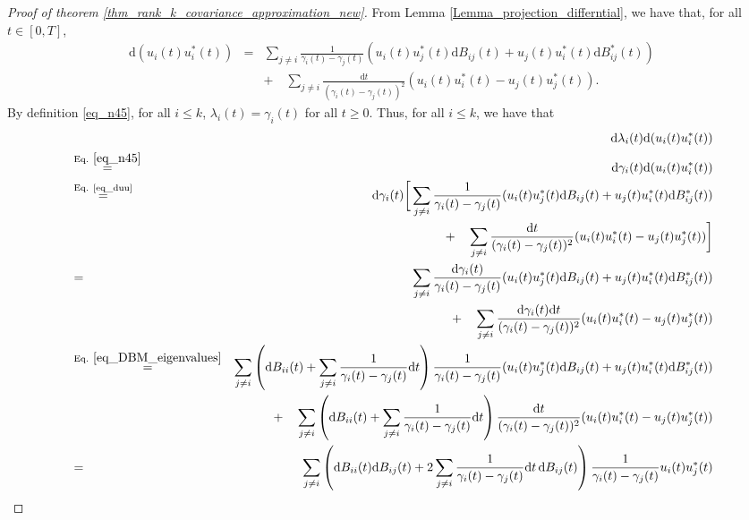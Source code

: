 \documentclass[11pt,letterpaper]{article}
\begin{document}
\begin{proof}[Proof of theorem \ref{thm_rank_k_covariance_approximation_new}]
%
From Lemma \ref{Lemma_projection_differntial}, we have that, for all $t \in [0,T]$, 
%
\begin{eqnarray}\label{eq_duu}
\mathrm{d}(u_i(t) u_i^\ast(t))&=&        \sum_{j \neq i} \frac{1}{\gamma_i(t) - \gamma_j(t)}(u_i(t) u_j^\ast(t)\mathrm{d}B_{ij}(t) + u_j(t) u_i^\ast(t)\mathrm{d}B_{ij}^\ast(t)) \nonumber \\ & & + \quad \sum_{j \neq i} \frac{\mathrm{d}t}{(\gamma_i(t)- \gamma_j(t))^2} (u_i(t) u_i^\ast(t) - u_j(t)u_j^\ast(t)).
\end{eqnarray}
%
By definition \eqref{eq_n45}, for all $i\leq k$,  $\lambda_i(t) = \gamma_i(t)$ for all $t\geq 0$.
%
Thus, for all $i \leq k$, we have that 
%
\begin{eqnarray}
& & \!\!\!\!\!\!\!\! \! \!\! \! \!\!\!\!\!\!\!\!\!\!\!\!\!\!\!\! \! \! \mathrm{d}\lambda_i(t) \mathrm{d}( u_i(t) u_i^\ast(t))\nonumber\\
%
&\stackrel{\textrm{Eq. } \eqref{eq_n45}}{=}& \mathrm{d}\gamma_i(t) \mathrm{d}( u_i(t) u_i^\ast(t)) \label{eq_dlambda_du.1} \\
%
&\stackrel{\textrm{Eq. \eqref{eq_duu}}}{=}& \mathrm{d}\gamma_i(t) \bigg[\sum_{j \neq i} \frac{1}{\gamma_i(t) - \gamma_j(t)}(u_i(t) u_j^\ast(t)\mathrm{d}B_{ij}(t) + u_j(t) u_i^\ast(t)\mathrm{d}B_{ij}^\ast(t))\nonumber\\
%
& & \quad \quad  \quad + \quad \sum_{j \neq i} \frac{\mathrm{d}t}{(\gamma_i(t)- \gamma_j(t))^2} (u_i(t) u_i^\ast(t) - u_j(t)u_j^\ast(t))\bigg]\nonumber\\
%
&=& \sum_{j \neq i} \frac{\mathrm{d}\gamma_i(t)}{\gamma_i(t) - \gamma_j(t)}(u_i(t) u_j^\ast(t)\mathrm{d}B_{ij}(t) + u_j(t) u_i^\ast(t) \mathrm{d}B_{ij}^\ast(t) )\nonumber\\
%
& &  + \quad \sum_{j \neq i} \frac{\mathrm{d}\gamma_i(t)\mathrm{d}t}{(\gamma_i(t)- \gamma_j(t))^2} (u_i(t) u_i^\ast(t) - u_j(t)u_j^\ast(t))\nonumber\\
%
&\stackrel{\textrm{Eq. } \eqref{eq_DBM_eigenvalues}}{=}& \sum_{j \neq i} \left(\mathrm{d}B_{i i}(t) +   \sum_{j \neq i} \frac{1}{\gamma_i(t) - \gamma_j(t)} \mathrm{d}t \right)\frac{1}{\gamma_i(t) - \gamma_j(t)}(u_i(t) u_j^\ast(t)\mathrm{d}B_{ij}(t) + u_j(t) u_i^\ast(t)\mathrm{d}B_{ij}^\ast(t))\nonumber\\
%
& & + \quad \sum_{j \neq i} \left(\mathrm{d}B_{i i}(t) +   \sum_{j \neq i} \frac{1}{\gamma_i(t) - \gamma_j(t)} \mathrm{d}t\right) \frac{\mathrm{d}t}{(\gamma_i(t)- \gamma_j(t))^2} (u_i(t) u_i^\ast(t) - u_j(t)u_j^\ast(t))\nonumber\\
%
&=& \sum_{j \neq i} \left(\mathrm{d}B_{i i}(t)\mathrm{d}B_{ij}(t) +  2 \sum_{j \neq i} \frac{1}{\gamma_i(t) - \gamma_j(t)} \mathrm{d}t \, \mathrm{d}B_{ij}(t) \right)\frac{1}{\gamma_i(t) - \gamma_j(t)}u_i(t) u_j^\ast(t)\nonumber\\

\end{eqnarray}
\end{proof}
\end{document}
